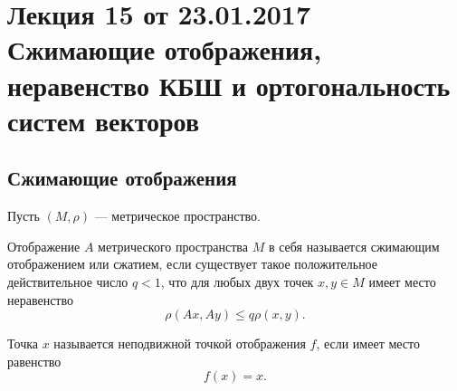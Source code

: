 \section{Лекция 15 от 23.01.2017 \\Сжимающие отображения, неравенство КБШ и ортогональность систем векторов}

\subsection{Сжимающие отображения}

Пусть  $(M, \rho)$ --- метрическое пространство.

\begin{Def}
Отображение  $A$ метрического пространства  $M$ в себя называется сжимающим отображением или сжатием, если существует такое положительное действительное число  $q < 1$, что для любых двух точек  $x,y \in M$ имеет место неравенство
 $$\rho(Ax, Ay) \le q \rho(x, y).$$
\end{Def}

\begin{Def}
Точка $x$ называется неподвижной точкой отображения $f$, если имеет место равенство
$$f(x) = x.$$
\end{Def}


